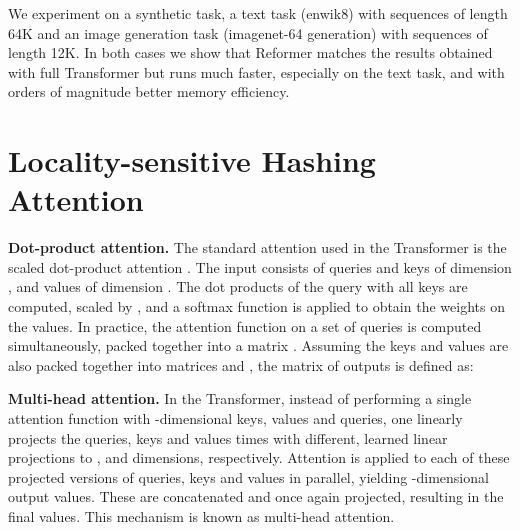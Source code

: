 \documentclass{article} \usepackage{iclr2020_conference,times}
\renewcommand{\paragraph}[1]{\textbf{#1}}
\begin{document}
We experiment on a synthetic task, a text task (enwik8) with sequences of length 64K and an image generation task (imagenet-64 generation)
with sequences of length 12K. In both cases we show that Reformer matches the results obtained with full Transformer
but runs much faster, especially on the text task, and with orders of magnitude better memory efficiency.

\section{Locality-sensitive Hashing Attention}

\paragraph{Dot-product attention.}
The standard attention used in the Transformer is the scaled dot-product attention \citep{transformer}. 
The input consists of queries and keys of dimension , and values of dimension .  
The dot products of the query with all keys are computed, scaled by , and a softmax function is 
applied to obtain the weights on the values. In practice, the attention function on a set of queries is computed 
simultaneously, packed together into a matrix .  Assuming the keys and values are also packed together into 
matrices  and , the matrix of outputs is defined as:



\paragraph{Multi-head attention.}
In the Transformer, instead of performing a single attention function with -dimensional keys, 
values and queries, one linearly projects the queries, keys and values  times with different, 
learned linear projections to ,  and  dimensions, respectively.  Attention is applied to 
each of these projected versions of queries, keys and values in parallel, yielding -dimensional 
output values. These are concatenated and once again projected, resulting in the final values. This 
mechanism is known as multi-head attention.
\end{document}
